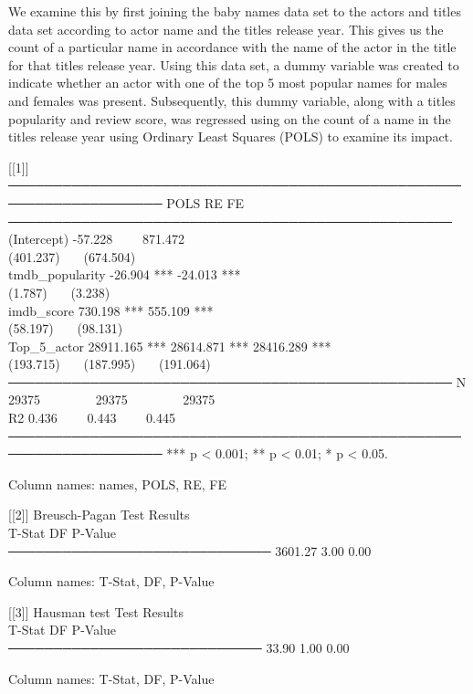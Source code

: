 \documentclass[11pt,preprint, authoryear]{elsarticle}
\numberwithin{equation}{section}
\numberwithin{figure}{section}
\numberwithin{table}{section}
\begin{document}
We examine this by first joining the baby names data set to the actors
and titles data set according to actor name and the titles release year.
This gives us the count of a particular name in accordance with the name
of the actor in the title for that titles release year. Using this data
set, a dummy variable was created to indicate whether an actor with one
of the top 5 most popular names for males and females was present.
Subsequently, this dummy variable, along with a titles popularity and
review score, was regressed using on the count of a name in the titles
release year using Ordinary Least Squares (POLS) to examine its impact.

{[}{[}1{]}{]}
─────────────────────────────────────────────────────────────────── POLS
RE FE\\
───────────────────────────────────────────────── (Intercept)
-57.228~~~~ 871.472~~~~ ~~~~~~~~\\
(401.237)~~~ (674.504)~~~ ~~~~~~~~\\
tmdb\_popularity -26.904 *** -24.013 *** ~~~~~~~~\\
(1.787)~~~ (3.238)~~~ ~~~~~~~~\\
imdb\_score 730.198 *** 555.109 *** ~~~~~~~~\\
(58.197)~~~ (98.131)~~~ ~~~~~~~~\\
Top\_5\_actor 28911.165 *** 28614.871 *** 28416.289 ***\\
(193.715)~~~ (187.995)~~~ (191.064)~~~\\
───────────────────────────────────────────────── N 29375~~~~~~~~
29375~~~~~~~~ 29375~~~~~~~~\\
R2 0.436~~~~ 0.443~~~~ 0.445~~~~\\
─────────────────────────────────────────────────────────────────── ***
p \textless{} 0.001; ** p \textless{} 0.01; * p \textless{} 0.05.

Column names: names, POLS, RE, FE

{[}{[}2{]}{]} Breusch-Pagan Test Results\\
T-Stat DF P-Value\\
───────────────────────────── 3601.27 3.00 0.00

Column names: T-Stat, DF, P-Value

{[}{[}3{]}{]} Hausman test Test Results\\
T-Stat DF P-Value\\
──────────────────────────── 33.90 1.00 0.00

Column names: T-Stat, DF, P-Value
\end{document}
